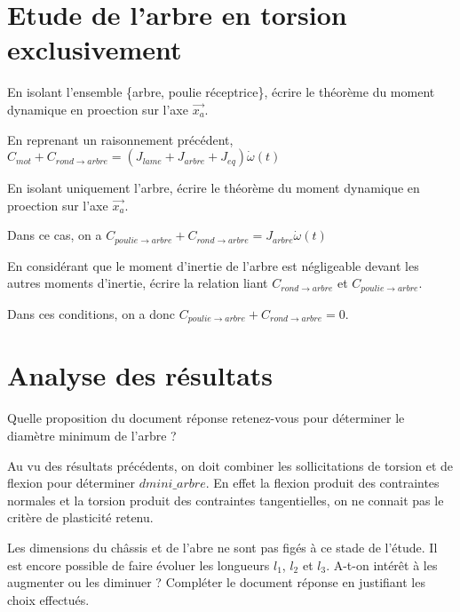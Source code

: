 \documentclass[11pt]{article}
\begin{document}
\section{Etude de l'arbre en torsion exclusivement}
\UPSTIquestion* En isolant l'ensemble \{arbre, poulie réceptrice\}, écrire le théorème du moment dynamique en proection sur l'axe $\overrightarrow{x_a}$.

\begin{UPSTIcorrige}
En reprenant un raisonnement précédent, 
$  C_{mot}+C_{rond\rightarrow arbre} = \left(J_{lame}+J_{arbre}+J_{eq}\right) \dot{\omega}(t)$
\end{UPSTIcorrige}

\UPSTIquestion En isolant uniquement l'arbre, écrire le théorème du moment dynamique en proection sur l'axe $\overrightarrow{x_a}$.

\begin{UPSTIcorrige}
Dans ce cas, on a 
$  C_{poulie \rightarrow arbre}+C_{rond\rightarrow arbre} = J_{arbre} \dot{\omega}(t)$
\end{UPSTIcorrige}

\UPSTIquestion En considérant que le moment d'inertie de l'arbre est négligeable devant les autres moments d'inertie, écrire la relation liant $C_{rond\rightarrow arbre}$ et $C_{poulie\rightarrow arbre}$.

\begin{UPSTIcorrige}
Dans ces conditions, on a donc $  C_{poulie \rightarrow arbre}+C_{rond\rightarrow arbre} =0$.
\end{UPSTIcorrige}

\section{Analyse des résultats}

\UPSTIquestion* Quelle proposition du document réponse retenez-vous pour déterminer le diamètre minimum de l'arbre ?

\begin{UPSTIcorrige}
Au vu des résultats précédents, on doit combiner les sollicitations de torsion et de flexion pour déterminer $dmini\_arbre$.
En effet la flexion produit des contraintes normales et la torsion produit des contraintes tangentielles, on ne 
connait pas le critère de plasticité retenu.
\end{UPSTIcorrige}

\UPSTIquestion Les dimensions du châssis et de l'abre ne sont pas figés à ce stade de l'étude. Il est encore possible de faire évoluer les longueurs $l_1$, $l_2$ et $l_3$. A-t-on intérêt à les augmenter ou les diminuer ? Compléter le document réponse en justifiant les choix effectués. 
\end{document}
